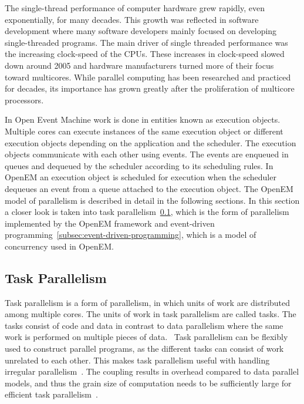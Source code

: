 The single-thread performance of computer hardware grew rapidly, even exponentially, for many decades. This growth was reflected in software development where many software developers mainly focused on developing single-threaded programs. The main driver of single threaded performance was the increasing clock-speed of the CPUs. These increases in clock-speed slowed down around 2005 and hardware manufacturers turned more of their focus toward multicores. While parallel computing has been researched and practiced for decades, its importance has grown greatly after the proliferation of multicore processors.~\cite{sutter2005free}

In Open Event Machine work is done in entities known as execution objects. Multiple cores can execute instances of the same execution object or different execution objects depending on the application and the scheduler. The execution objects communicate with each other using events. The events are enqueued in queues and dequeued by the scheduler according to its scheduling rules. In OpenEM an execution object is scheduled for execution when the scheduler dequeues an event from a queue attached to the execution object. The OpenEM model of parallelism is described in detail in the following sections. In this section a closer look is taken into task parallelism~\ref{subsec:task-parallelism}, which is the form of parallelism implemented by the OpenEM framework and event-driven programming~\ref{subsec:event-driven-programming}, which is a model of concurrency used in OpenEM.

\subsection{Task Parallelism}
\label{subsec:task-parallelism}
Task parallelism is a form of parallelism, in which units of work are distributed among multiple cores. The units of work in task parallelism are called tasks. The tasks consist of code and data in contrast to data parallelism where the same work is performed on multiple pieces of data.~\cite{hennessy2011computer} Task parallelism can be flexibly used to construct parallel programs, as the different tasks can consist of work unrelated to each other. This makes task parallelism useful with handling irregular parallelism~\cite{ayguade2009design}. The coupling results in overhead compared to data parallel models, and thus the grain size of computation needs to be sufficiently large for efficient task parallelism~\cite{subhlok1993exploiting}.

